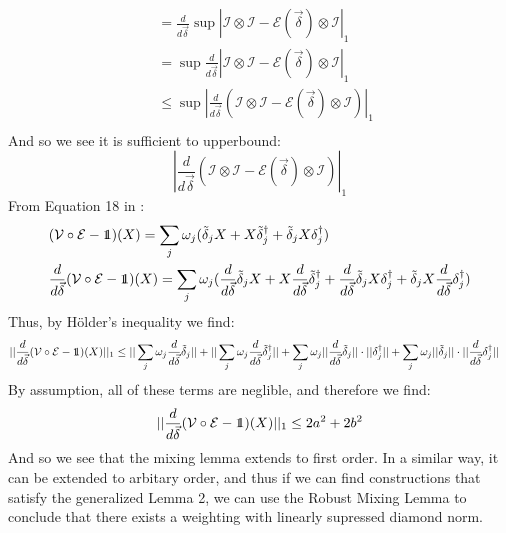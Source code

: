 \documentclass[aps,nofootinbib,pra,notitlepage,twocolumn]{revtex4-1}
\newcommand{\deriv}[0]{{\frac{d}{d\vec{\delta}}}}
\newcommand{\error}{\ensuremath{{\mathcal{E}}}}
\def\id{\mbox{\small 1} \!\! \mbox{1}}
\begin{document}
\begin{align}
&= \deriv\sup|\mathcal{I}\otimes\mathcal{I}-\error(\vec{\delta})\otimes\mathcal{I}|_1 \\
&= \sup\deriv|\mathcal{I}\otimes\mathcal{I}-\error(\vec{\delta})\otimes\mathcal{I}|_1 \\
&\leq \sup|\deriv(\mathcal{I}\otimes\mathcal{I}-\error(\vec{\delta})\otimes\mathcal{I})|_1 \\
\end{align}
And so we see it is sufficient to upperbound:
\begin{equation}
|\deriv(\mathcal{I}\otimes\mathcal{I}-\error(\vec{\delta})\otimes\mathcal{I})|_1
\end{equation}
From Equation 18 in \cite{Campbell2017}:
\begin{align}
&(\mathcal{V}\circ\mathcal{E} - \id)(X) = \sum_j \omega_j(\tilde{\delta}_jX + X\tilde{\delta}_j^{\dagger} + \tilde{\delta}_jX\delta_j^{\dagger})\\
&\deriv(\mathcal{V}\circ\mathcal{E} - \id)(X) = \sum_j \omega_j(\deriv\tilde{\delta}_jX + X\deriv\tilde{\delta}_j^{\dagger} + \deriv\tilde{\delta}_jX\delta_j^{\dagger} + \tilde{\delta}_jX\deriv\delta_j^{\dagger})\\
\end{align}
Thus, by H\"older's inequality we find:
\begin{align}
&||\deriv(\mathcal{V}\circ\mathcal{E} - \id)(X)||_1\leq||\sum_j \omega_j\deriv\tilde{\delta}_j|| + ||\sum_j\omega_j\deriv\tilde{\delta}_j^{\dagger}|| + \sum_j\omega_j|| \deriv\tilde{\delta}_j||\cdot||\delta_j^{\dagger}|| + \sum_j\omega_j||\tilde{\delta}_j||\cdot||\deriv\delta_j^{\dagger}||
\end{align}
By assumption, all of these terms are neglible, and therefore we find:
\begin{align}
||\deriv(\mathcal{V}\circ\mathcal{E} - \id)(X)||_1\leq 2a^2 + 2b^2
\end{align}
And so we see that the mixing lemma extends to first order. In a similar way, it can be extended to arbitary order, and thus if we can find constructions that satisfy the generalized Lemma 2, we can use the Robust Mixing Lemma to conclude that there exists a weighting with linearly supressed diamond norm.
\end{document}
